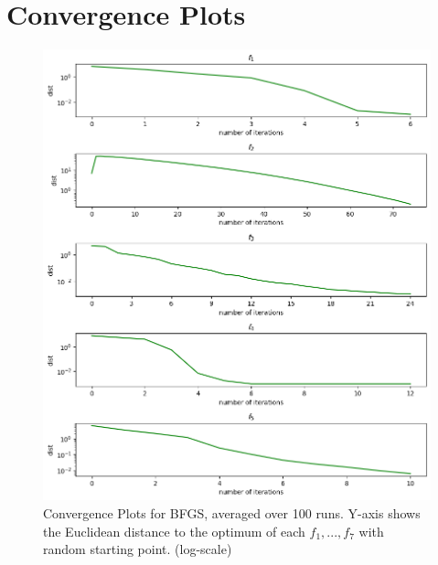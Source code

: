 \documentclass[a4paper]{article}
\begin{document}
\section{Convergence Plots}
\label{sec:conv}
\begin{figure}[H]
  \centering
  \includegraphics[width=\textwidth]{plt.png}
  \caption{Convergence Plots for BFGS, averaged over 100 runs. Y-axis shows the
    Euclidean distance to the optimum of each $f_1,...,f_7$ with random starting point. (log-scale) }
  \label{plt1}
\end{figure}
\end{document}
